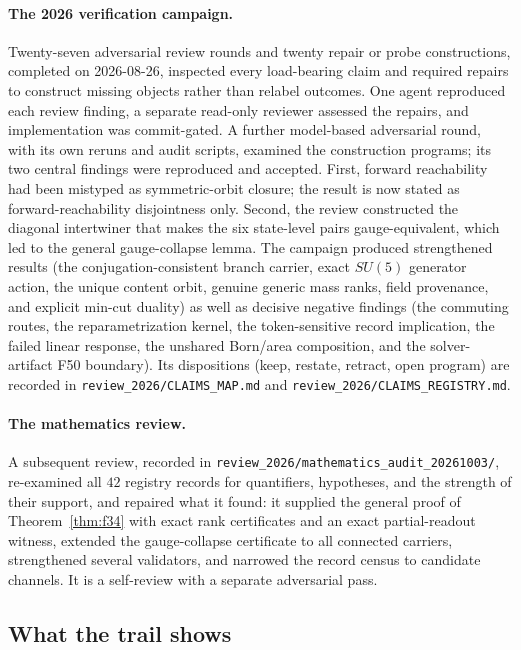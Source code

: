 \documentclass[11pt]{article}
\theoremstyle{definition}
\begin{document}
\paragraph{The 2026 verification campaign.} Twenty-seven adversarial review rounds and twenty repair or probe
constructions, completed on 2026-08-26, inspected every load-bearing claim and required repairs to construct missing
objects rather than relabel outcomes. One agent reproduced each review finding, a separate read-only reviewer assessed
the repairs, and implementation was commit-gated. A further model-based adversarial round, with its own reruns and audit
scripts, examined the construction programs; its two central findings were reproduced and accepted. First, forward
reachability had been mistyped as symmetric-orbit closure; the result is now stated as forward-reachability disjointness
only. Second, the review constructed the diagonal intertwiner that makes the six state-level pairs gauge-equivalent,
which led to the general gauge-collapse lemma. The campaign produced strengthened results (the conjugation-consistent
branch carrier, exact \(SU(5)\) generator action, the unique content orbit, genuine generic mass ranks, field
provenance, and explicit min-cut duality) as well as decisive negative findings (the commuting routes, the
reparametrization kernel, the token-sensitive record implication, the failed linear response, the unshared Born/area
composition, and the solver-artifact F50 boundary). Its dispositions (keep, restate, retract, open program) are
recorded in \nolinkurl{review_2026/CLAIMS_MAP.md} and \nolinkurl{review_2026/CLAIMS_REGISTRY.md}.

\paragraph{The mathematics review.} A subsequent review, recorded in
\nolinkurl{review_2026/mathematics_audit_20261003/}, re-examined all \(42\) registry records for quantifiers,
hypotheses, and the strength of their support, and repaired what it found: it supplied the general proof of
Theorem~\ref{thm:f34} with exact rank certificates and an exact partial-readout witness, extended the gauge-collapse
certificate to all connected carriers, strengthened several validators, and narrowed the record census to candidate
channels. It is a self-review with a separate adversarial pass.

\subsection{What the trail shows}\label{what-the-trail-shows}
\end{document}
